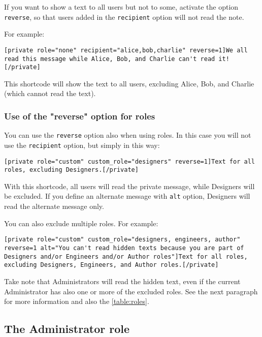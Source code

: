 \documentclass[a4paper,10pt]{article}
\begin{document}
If you want to show a text to all users but not to some, activate the option \verb+reverse+, so that users added in the \verb+recipient+ option will not read the note.

For example:

\begin{lstlisting}
[private role="none" recipient="alice,bob,charlie" reverse=1]We all read this message while Alice, Bob, and Charlie can't read it![/private]
\end{lstlisting}

This shortcode will show the text to all users, excluding Alice, Bob, and Charlie (which cannot read the text).

\subsubsection{Use of the "reverse" option for roles}

You can use the \verb+reverse+ option also when using roles. In this case you will not use the \verb+recipient+ option, but simply in this way:

\begin{lstlisting}
[private role="custom" custom_role="designers" reverse=1]Text for all roles, excluding Designers.[/private]
\end{lstlisting}

With this shortcode, all users will read the private message, while Designers will be excluded. If you define an alternate message with \verb+alt+ option, Designers will read the alternate message only.

You can also exclude multiple roles. For example:

\begin{lstlisting}
[private role="custom" custom_role="designers, engineers, author" reverse=1 alt="You can't read hidden texts because you are part of Designers and/or Engineers and/or Author roles"]Text for all roles, excluding Designers, Engineers, and Author roles.[/private]
\end{lstlisting}

Take note that Administrators will read the hidden text, even if the current Administrator has also one or more of the excluded roles. See the next paragraph for more information and also the \ref{table:roles}.

\subsection{The Administrator role}
\end{document}

